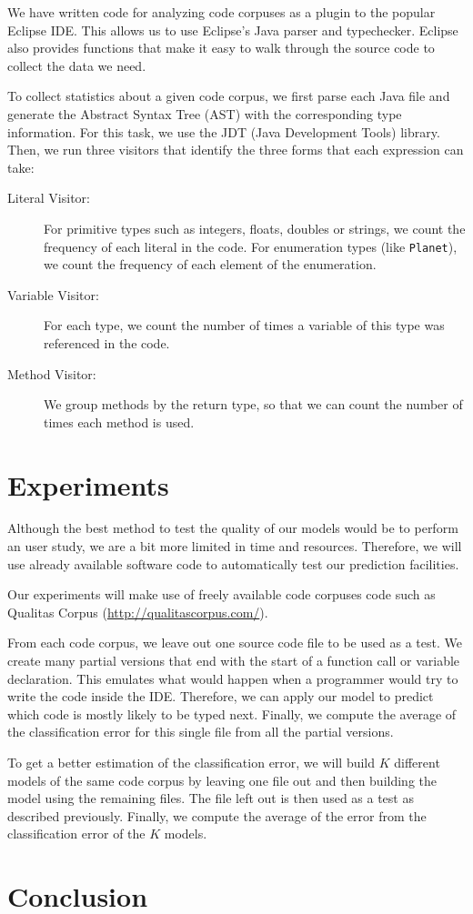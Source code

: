 \documentclass{article} %
\begin{document}
We have written code for analyzing code corpuses as a plugin to the popular Eclipse IDE. This allows us to use Eclipse's Java parser and typechecker. Eclipse also provides functions that make it easy to walk through the source code to collect the data we need.

To collect statistics about a given code corpus, we first parse each Java file and generate the Abstract Syntax Tree (AST) with the corresponding type information. For this task, we use the JDT (Java Development Tools) library. Then, we run three visitors that identify the three forms that each expression can take:

\begin{description}
   \item[Literal Visitor:] For primitive types such as integers, floats, doubles or strings, we count the frequency of each literal in the code. For enumeration types (like \texttt{Planet}), we count the frequency of each element of the enumeration.

   \item[Variable Visitor:] For each type, we count the number of times a variable of this type was referenced in the code.

   \item[Method Visitor:] We group methods by the return type, so that we can count the number of times each method is used.
\end{description}

\section*{Experiments}

Although the best method to test the quality of our models would be to perform an user study, we are a bit more limited in time and resources. Therefore, we will use already available software code to automatically test our prediction facilities.

Our experiments will make use of freely available code corpuses code such as Qualitas Corpus (\url{http://qualitascorpus.com/}).

From each code corpus, we leave out one source code file to be used as a test.
We create many partial versions that end with the start of a function call or variable declaration. This emulates what would happen when a programmer would try to write the code inside the IDE. Therefore, we can apply our model to predict which code is mostly likely to be typed next. Finally, we compute the average of the classification error for this single file from all the partial versions.

To get a better estimation of the classification error, we will build $K$ different models of the same code corpus by leaving one file out and then building the model using the remaining files. The file left out is then used as a test as described previously. Finally, we compute the average of the error from the classification error of the $K$ models.

\section*{Conclusion}



\end{document}
